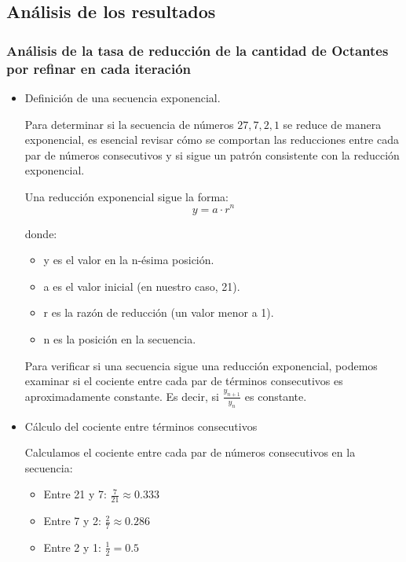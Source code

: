 \subsection{Análisis de los resultados}

\subsubsection{Análisis de la tasa de reducción de la cantidad de Octantes por refinar en cada iteración }

\begin{itemize}
    \item Definición de una secuencia exponencial.

    Para determinar si la secuencia de números $27, 7, 2, 1$ se reduce de manera exponencial, es esencial revisar cómo se comportan las reducciones entre cada par de números consecutivos y si sigue un patrón consistente con la reducción exponencial.

    Una reducción exponencial sigue la forma:
    $$y = a \cdot r^n$$
     
    donde:
    
    \begin{itemize}
        \item y es el valor en la n-ésima posición.
        \item a es el valor inicial (en nuestro caso, 21).
        \item r es la razón de reducción (un valor menor a 1).
        \item n es la posición en la secuencia.
    \end{itemize}
    
    Para verificar si una secuencia sigue una reducción exponencial, podemos examinar si el cociente entre cada par de términos consecutivos es aproximadamente constante. Es decir, si $\frac{y_{n+1}}{y_n}$ es constante.

    \item Cálculo del cociente entre términos consecutivos

    Calculamos el cociente entre cada par de números consecutivos en la secuencia:

    \begin{itemize}
        \item  Entre 21 y 7: $\frac{7}{21} \approx 0.333$
        \item  Entre 7 y 2: $\frac{2}{7} \approx 0.286$
        \item  Entre 2 y 1: $\frac{1}{2} = 0.5$
    \end{itemize}


\end{itemize}
